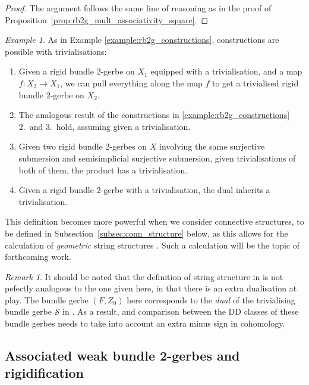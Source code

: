 \documentclass[12pt]{amsart}
\theoremstyle{plain}
\theoremstyle{definition}
\theoremstyle{remark}
\newtheorem{example}[theorem]{Example}
\newtheorem{remark}[theorem]{Remark}
\numberwithin{equation}{section}
\newcommand{\<}{\langle}
\renewcommand{\>}{\rangle}
\begin{document}
\begin{proof}
The argument follows the same line of reasoning as in the proof of Proposition~\ref{prop:rb2g_mult_associativity_square}.
\end{proof}

\begin{example}\label{example:triv_rb2g_constructions}
As in Example \ref{example:rb2g_constructions}, constructions are possible with trivialisations:
\begin{enumerate}[1.]
\item
  Given a rigid bundle 2-gerbe on $X_1$ equipped with a trivialisation, and a map $f\colon X_2\to X_1$, we can pull everything along the map $f$ to get a trivialised rigid bundle 2-gerbe on $X_2$.
\item
  The analogous result of the constructions in \ref{example:rb2g_constructions} 2.\ and 3.\ hold, assuming given a trivialisation.
\item
  Given two rigid bundle 2-gerbes on $X$ involving the same surjective submersion and semisimplicial surjective submersion, given trivialisations of both of them, the product has a trivialisation.
\item
  Given a rigid bundle 2-gerbe with a trivialisation, the dual inherits a trivialisation.


\end{enumerate}
\end{example}


This definition becomes more powerful when we consider connective structures, to be defined in Subsection~\ref{subsec:conn_structure} below, as this allows for the calculation of \emph{geometric} string structures \cite[Definition 2.8]{Wal}.
Such a calculation will be the topic of forthcoming work.

\begin{remark}
It should be noted that the definition of string structure in \cite{Wal} is not pefectly analogous to the one given here, in that there is an extra dualisation at play. The bundle gerbe $(F,Z_0)$ here corresponds to the \emph{dual} of the trivialising bundle gerbe $\mathcal{S}$ in \cite[Definition 3.5]{Wal}. As a result, and comparison between the DD classes of these bundle gerbes needs to take into account an extra minus sign in cohomology.
\end{remark}

\subsection{Associated weak bundle 2-gerbes and rigidification}\label{subsec:associated_b2gs}
\end{document}
